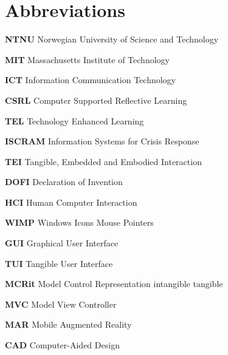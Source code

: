 \chapter{Abbreviations}\label{abbreviations}

\textbf{NTNU} Norwegian University of Science and Technology

\textbf{MIT} Massachusetts Institute of Technology

\textbf{ICT} Information Communication Technology

\textbf{CSRL} Computer Supported Reflective Learning

\textbf{TEL} Technology Enhanced Learning

\textbf{ISCRAM} Information Systems for Crisis Response

\textbf{TEI} Tangible, Embedded and Embodied Interaction

\textbf{DOFI} Declaration of Invention

\textbf{HCI} Human Computer Interaction

\textbf{WIMP} Windows Icons Mouse Pointers

\textbf{GUI} Graphical User Interface

\textbf{TUI} Tangible User Interface

\textbf{MCRit} Model Control Representation intangible tangible

\textbf{MVC} Model View Controller

\textbf{MAR} Mobile Augmented Reality

\textbf{CAD} Computer-Aided Design

